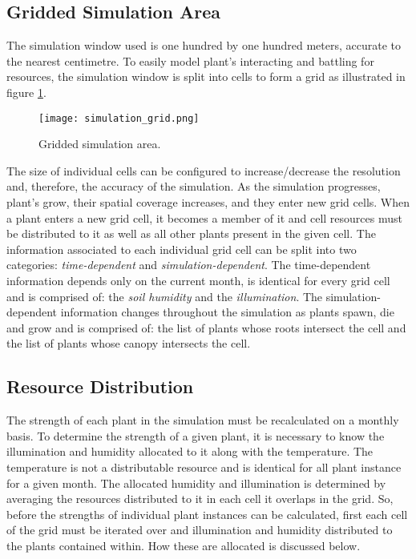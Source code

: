 \subsection{Gridded Simulation Area}

The simulation window used is one hundred by one hundred meters, accurate to the nearest centimetre. To easily model plant's interacting and battling for resources, the simulation window is split into cells to form a grid as illustrated in figure \ref{fig:simulation_grid}. 

\begin{figure}
\center
	\texttt{[image: simulation\_grid.png]}
	\caption{ Gridded simulation area.}	
	\label{fig:simulation_grid}
\end{figure}

The size of individual cells can be configured to increase/decrease the resolution and, therefore, the accuracy of the simulation. As the simulation progresses, plant's grow, their spatial coverage increases, and they enter new grid cells. When a plant enters a new grid cell, it becomes a member of it and cell resources must be distributed to it as well as all other plants present in the given cell. The information associated to each individual grid cell can be split into two categories: \textit{time-dependent} and \textit{simulation-dependent}. The time-dependent information depends only on the current month, is identical for every grid cell and is comprised of: the \textit{soil humidity} and the \textit{illumination}. The simulation-dependent information changes throughout the simulation as plants spawn, die and grow and is comprised of: the list of plants whose roots intersect the cell and the list of plants whose canopy intersects the cell.

\subsection{Resource Distribution}

The strength of each plant in the simulation must be recalculated on a monthly basis. To determine the strength of a given plant, it is necessary to know the illumination and humidity allocated to it along with the temperature. The temperature is not a distributable resource and is identical for all plant instance for a given month. The allocated humidity and illumination is determined by averaging the resources distributed to it in each cell it overlaps in the grid. So, before the strengths of individual plant instances can be calculated, first each cell of the grid must be iterated over and illumination and humidity distributed to the plants contained within. How these are allocated is discussed below.

